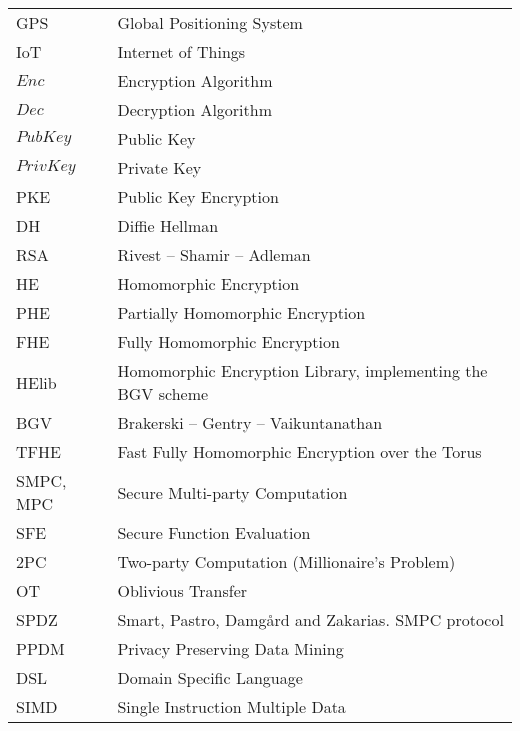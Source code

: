 \abbreviations
\begin{center}
	\renewcommand{\arraystretch}{1.5}
	\begin{longtable}{ l @{\qquad} l }
	\toprule
	GPS 			& Global Positioning System \\
	IoT				& Internet of Things \\
  $Enc$     & Encryption Algorithm \\
  $Dec$     & Decryption Algorithm \\
  $PubKey$  & Public Key \\
  $PrivKey$ & Private Key \\
  PKE       & Public Key Encryption \\
  DH        & Diffie Hellman \\
  RSA       & Rivest -- Shamir -- Adleman \\
  HE        & Homomorphic Encryption \\
  PHE       & Partially Homomorphic Encryption \\
  FHE       & Fully Homomorphic Encryption \\
  HElib     & Homomorphic Encryption Library, implementing the BGV scheme \\
  BGV       & Brakerski -- Gentry -- Vaikuntanathan \\
  TFHE      & Fast Fully Homomorphic Encryption over the Torus \\
  SMPC, MPC & Secure Multi-party Computation \\
  SFE       & Secure Function Evaluation \\
  2PC       & Two-party Computation (Millionaire's Problem) \\
  OT        & Oblivious Transfer \\
  SPDZ      & Smart, Pastro, Damg{\aa}rd and Zakarias. SMPC protocol \\
  PPDM      & Privacy Preserving Data Mining \\
  DSL       & Domain Specific Language \\
  SIMD      & Single Instruction Multiple Data \\

	\bottomrule
	\end{longtable}
\end{center}
